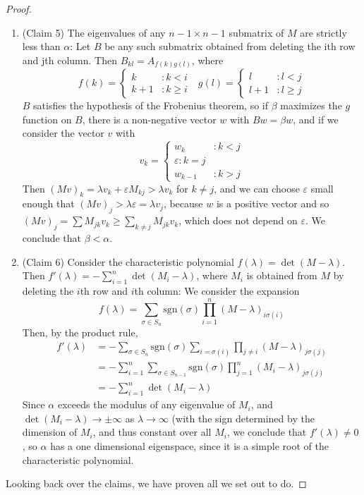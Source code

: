 \begin{proof}
\begin{enumerate}
        \item (Claim 5) The eigenvalues of any $n-1 \times n-1$ submatrix of $M$ are strictly less than $\alpha$: Let $B$ be any such submatrix obtained from deleting the ith row and jth column. Then $B_{kl} = A_{f(k)g(l)}$, where
        \[ f(k) = \begin{cases} k &: k < i \\ k+1 &: k \geq i \end{cases}\ \ \ g(l) = \begin{cases} l &: l < j \\ l+1 &: l \geq j \end{cases} \]
        $B$ satisfies the hypothesis of the Frobenius theorem, so if $\beta$ maximizes the $g$ function on $B$, there is a non-negative vector $w$ with $Bw = \beta w$, and if we consider the vector $v$ with
        \[ v_k = \begin{cases} w_k &: k < j \\ \varepsilon : k = j \\ w_{k-1} &: k > j \end{cases} \]
        Then $(Mv)_k = \lambda v_k + \varepsilon M_{kj} > \lambda v_k$ for $k \neq j$, and we can choose $\varepsilon$ small enough that $(Mv)_j > \lambda \varepsilon = \lambda v_j$, because $w$ is a positive vector and so $(Mv)_j = \sum M_{jk} v_k \geq \sum_{k \neq j} M_{jk} v_k$, which does not depend on $\varepsilon$. We conclude that $\beta < \alpha$.

        \item (Claim 6) Consider the characteristic polynomial $f(\lambda) = \det(M - \lambda)$. Then $f'(\lambda) = - \sum_{i = 1}^n \det(M_i - \lambda)$, where $M_i$ is obtained from $M$ by deleting the $i$th row and $i$th column: We consider the expansion
        \[ f(\lambda) = \sum_{\sigma \in S_n} \text{sgn}(\sigma) \prod_{i = 1}^n (M - \lambda)_{i\sigma(i)} \]
        Then, by the product rule,
        \begin{align*}
            f'(\lambda) &= - \sum_{\sigma \in S_n} \text{sgn}(\sigma) \sum_{i=\sigma(i)} \prod_{j \neq i} (M - \lambda)_{j\sigma(j)}\\
            &= -\sum_{i = 1}^n \sum_{\sigma \in S_{n-1}} \text{sgn}(\sigma) \prod_{j = 1}^n (M_i - \lambda)_{j \sigma(j)}\\
            &= -\sum_{i = 1}^n \det(M_i - \lambda)
        \end{align*}
        Since $\alpha$ exceeds the modulus of any eigenvalue of $M_i$, and $\det(M_i - \lambda) \to \pm \infty$ as $\lambda \to \infty$ (with the sign determined by the dimension of $M_i$, and thus constant over all $M_i$, we conclude that $f'(\lambda) \neq 0$, so $\alpha$ has a one dimensional eigenspace, since it is a simple root of the characteristic polynomial.
    \end{enumerate}
    Looking back over the claims, we have proven all we set out to do.
\end{proof}


